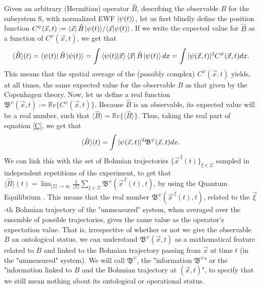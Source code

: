 \documentclass[11pt, a4paper]{article} %
\newcommand{\B}{\mathfrak{B}}
\begin{document}
Given an arbitrary (Hermitian) operator $\hat{B}$, describing the observable $B$ for the subsystem S, with normalized EWF $\ket{\psi(t)}$, let us first blindly define the position function $C^{\psi}(\vec{x},t):={\bra{\vec{x}}\hat{B}\ket{\psi(t)}}/{\bra{\vec{x}}\ket{\psi(t)}}$. If we write the expected value for $\hat{B}$ as a function of $C^\psi(\vec{x},t)$, we get that\vspace{-0.15cm}
\begin{equation}\label{C}
\langle \hat{B}\rangle(t)= \bra{\psi(t)}\hat{B}\ket{\psi(t)}=\int \bra{\psi(t)} \ket{\vec{x}}\bra{\vec{x}}\hat{B}\ket{\psi(t)}dx =  \int |\psi(\vec{x},t)|^2C^\psi(\vec{x},t)dx.\vspace{-0.1cm}
\end{equation}
This means that the spatial average of the (possibly complex) $C^\psi(\vec{x},t)$ yields, at all times, the same expected value for the observable $B$ as that given by the Copenhagen theory. Now, let us define a real function $\B^\psi(\vec{x},t):=\mathbb{R}e\{C^{\psi}(\vec{x},t)\}$. Because $\hat{B}$ is an observable, its expected value will be a real number, such that $\langle \hat{B}\rangle=\mathbb{R}e\{\langle \hat{B}\rangle\}$. Thus, taking the real part of equation \eqref{C}, we get that\vspace{-0.1cm}
\begin{equation}
\langle \hat{B}\rangle(t)=\int |\psi(\vec{x},t)|^2\B^\psi(\vec{x},t)dx.\vspace{-0.1cm}
\end{equation}
We can link this with the set of Bohmian trajectories $\{\vec{x}^{\:\xi}(t)\}_{\xi\in\Sigma}$ sampled in independent repetitions of the experiment, to get that $\langle \hat{B}\rangle(t)=\lim_{|\Sigma|\rightarrow \infty}\frac{1}{|\Sigma|} \sum_{\xi\in\Sigma} \B^\psi(\vec{x}^{\:\xi}(t),t)$, by
using the Quantum Equilibrium \cite{Absolute}. This means that the real number $\B^\psi(\vec{x}^{\;\xi}(t),t)$, related to the $\vec{\xi}$-th Bohmian trajectory of the "unmeasured" system, when averaged over the ensemble of possible trajectories, gives the same value as the operator's expectation value. That is, irrespective of whether or not we give the observable $B$ an ontological status, we can understand $\B^\psi(\vec{x},t)$ as a mathematical feature related to $B$ and linked to the Bohmian trajectory passing from $\vec{x}$ at time $t$ (in the "unmeasured" system). We will call $\B^\psi$, the "information $\B^\psi$" or the "information linked to $B$ and the Bohmian trajectory at $(\vec{x},t)$", to specify that we still mean nothing about its ontological or operational status.
\end{document}
